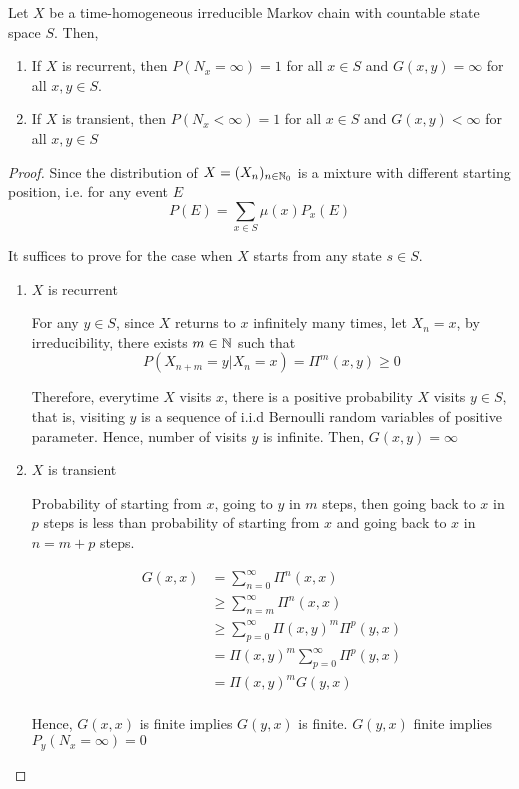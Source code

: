 \documentclass{report}
\begin{document}
\begin{proposition}
    Let $X$ be a time-homogeneous irreducible Markov chain with countable state space $S$. Then,
    \begin{enumerate}
        \item If $X$ is recurrent, then $P(N_x = \infty) = 1$ for all $x \in S$ and $G(x, y) = \infty$ for all $x, y \in S$.
        \item If $X$ is transient, then $P(N_x < \infty) = 1$ for all $x \in S$ and $G(x, y) < \infty$ for all $x, y \in S$
    \end{enumerate}
\begin{proof}
    Since the distribution of $X = (X_n)_{n \in \mathbb{N}_0}$ is a mixture with different starting position, i.e. for any event $E$
    $$
        P(E) = \sum_{x \in S} \mu(x) P_x(E)
    $$

    It suffices to prove for the case when $X$ starts from any state $s \in S$.
    
\begin{enumerate}
    \item $X$ is recurrent
    
    For any $y \in S$, since $X$ returns to $x$ infinitely many times, let $X_n = x$, by irreducibility, there exists $m \in \mathbb{N}$ such that
    $$
        P(X_{n+m} = y | X_n = x) = \Pi^m(x, y) \geq 0
    $$

    Therefore, everytime $X$ visits $x$, there is a positive probability $X$ visits $y \in S$, that is, visiting $y$ is a sequence of i.i.d Bernoulli random variables of positive parameter. Hence, number of visits $y$ is infinite. Then, $G(x, y) = \infty$

    \item $X$ is transient
    
    Probability of starting from $x$, going to $y$ in $m$ steps, then going back to $x$ in $p$ steps is less than probability of starting from $x$ and going back to $x$ in $n = m+p$ steps.
    
    \begin{align*}
        G(x, x) 
        &= \sum_{n=0}^\infty \Pi^n(x, x) \\
        &\geq \sum_{n=m}^\infty \Pi^n(x, x) \\
        &\geq \sum_{p=0}^\infty \Pi(x, y)^m \Pi^p(y, x) \\
        &= \Pi(x, y)^m \sum_{p=0}^\infty  \Pi^p(y, x) \\
        &= \Pi(x, y)^m G(y, x) \\
    \end{align*}

    Hence, $G(x, x) $ is finite implies $G(y, x)$ is finite. $G(y, x)$ finite implies $P_y(N_x = \infty) = 0$
\end{enumerate}
\end{proof}
\end{proposition}
\end{document}
